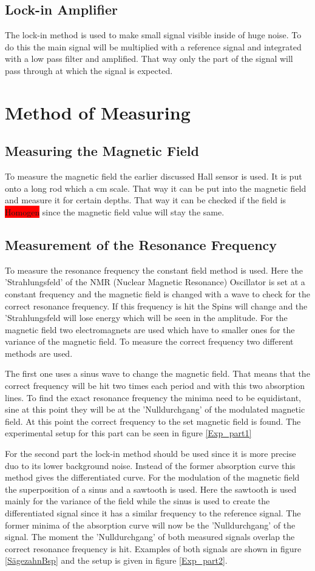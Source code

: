 \subsection{Lock-in Amplifier}
The lock-in method is used to make small signal visible inside of huge noise. To do this the main signal will be multiplied with a reference signal and integrated with a low pass filter and amplified. That way only the part of the signal will pass through at which the signal is expected.
\section{Method of Measuring}
\subsection{Measuring the Magnetic Field}
To measure the magnetic field the earlier discussed Hall sensor is used. It is put onto a long rod which a cm scale. That way it can be put into the magnetic field and measure it for certain depths. That way it can be checked if the field is \colorbox{red}{Homogen} since the magnetic field value will stay the same.
\subsection{Measurement of the Resonance Frequency}
To measure the resonance frequency the constant field method is used. Here the 'Strahlungsfeld' of the NMR (Nuclear Magnetic Resonance) Oscillator is set at a constant frequency and the magnetic field is changed with a wave to check for the correct resonance frequency. If this frequency is hit the Spins will change and the 'Strahlungsfeld will lose energy which will be seen in the amplitude. For the magnetic field two electromagnets are used which have to smaller ones for the variance of the magnetic field. To measure the correct frequency two different methods are used.\par
The first one uses a sinus wave to change the magnetic field. That means that the correct frequency will be hit two times each period and with this two absorption lines. To find the exact resonance frequency the minima need to be equidistant, sine at this point they will be at the 'Nulldurchgang' of the modulated magnetic field. At this point the correct frequency to the set magnetic field is found. The experimental setup for this part can be seen in figure \ref{Exp_part1} \par
For the second part the lock-in method should be used since it is more precise duo to its lower background noise. Instead of the former absorption curve this method gives the differentiated curve. For the modulation of the magnetic field the superposition of a sinus and a sawtooth is used. Here the sawtooth is used mainly for the variance of the field while the sinus is used to create the differentiated signal since it has a similar frequency to the reference signal. The former minima of the absorption curve will now be the 'Nulldurchgang' of the signal. The moment the 'Nulldurchgang' of both measured signals overlap the correct resonance frequency is hit. Examples of both signals are shown in figure \ref{SägezahnBsp} and the setup is given in figure \ref{Exp_part2}.

